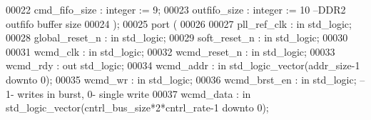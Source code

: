 \begin{DoxyCode}
00022             \textcolor{vhdlchar}{cmd_fifo_size}       \textcolor{vhdlchar}{:} \textcolor{comment}{integer} \textcolor{vhdlchar}{:=} \textcolor{vhdllogic}{}\textcolor{vhdllogic}{9};
00023             \textcolor{vhdlchar}{outfifo_size}        \textcolor{vhdlchar}{:} \textcolor{comment}{integer} \textcolor{vhdlchar}{:=} \textcolor{vhdllogic}{}\textcolor{vhdllogic}{10}\textcolor{keyword}{  --DDR2 outfifo buffer size}
00024         \textcolor{vhdlchar}{)};
00025         \textcolor{keywordflow}{port} \textcolor{vhdlchar}{(}
00026 
00027       \textcolor{vhdlchar}{pll_ref_clk}       \textcolor{vhdlchar}{:} \textcolor{keywordflow}{in} \textcolor{comment}{std\_logic};
00028       \textcolor{vhdlchar}{global_reset_n}    \textcolor{vhdlchar}{:} \textcolor{keywordflow}{in} \textcolor{comment}{std\_logic};
00029         \textcolor{vhdlchar}{soft_reset_n}        \textcolor{vhdlchar}{:} \textcolor{keywordflow}{in} \textcolor{comment}{std\_logic};
00030 
00031         \textcolor{vhdlchar}{wcmd_clk}                \textcolor{vhdlchar}{:} \textcolor{keywordflow}{in} \textcolor{comment}{std\_logic};
00032         \textcolor{vhdlchar}{wcmd_reset_n}        \textcolor{vhdlchar}{:} \textcolor{keywordflow}{in}  \textcolor{comment}{std\_logic};
00033         \textcolor{vhdlchar}{wcmd_rdy}                \textcolor{vhdlchar}{:} \textcolor{keywordflow}{out} \textcolor{comment}{std\_logic};
00034         \textcolor{vhdlchar}{wcmd_addr}           \textcolor{vhdlchar}{:} \textcolor{keywordflow}{in} \textcolor{comment}{std\_logic\_vector}\textcolor{vhdlchar}{(}\textcolor{vhdlchar}{addr_size}\textcolor{vhdlchar}{-}\textcolor{vhdllogic}{}\textcolor{vhdllogic}{1} \textcolor{keywordflow}{downto} \textcolor{vhdllogic}{}\textcolor{vhdllogic}{0}\textcolor{vhdlchar}{)};
00035         \textcolor{vhdlchar}{wcmd_wr}             \textcolor{vhdlchar}{:} \textcolor{keywordflow}{in} \textcolor{comment}{std\_logic};
00036         \textcolor{vhdlchar}{wcmd_brst_en}        \textcolor{vhdlchar}{:} \textcolor{keywordflow}{in} \textcolor{comment}{std\_logic};\textcolor{keyword}{ --1- writes in burst, 0- single write}
00037         \textcolor{vhdlchar}{wcmd_data}           \textcolor{vhdlchar}{:} \textcolor{keywordflow}{in} \textcolor{comment}{std\_logic\_vector}\textcolor{vhdlchar}{(}\textcolor{vhdlchar}{cntrl_bus_size}\textcolor{vhdlchar}{*}\textcolor{vhdllogic}{}\textcolor{vhdllogic}{2}\textcolor{vhdlchar}{*}\textcolor{vhdlchar}{cntrl_rate}\textcolor{vhdlchar}{-}\textcolor{vhdllogic}{}\textcolor{vhdllogic}{1} \textcolor{keywordflow}{downto} \textcolor{vhdllogic}{}\textcolor{vhdllogic}{0}\textcolor{vhdlchar}{)};

\end{DoxyCode}
